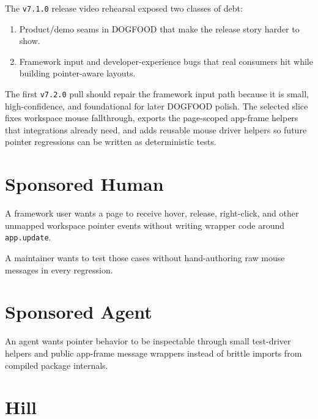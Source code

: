 The \texttt{v\allowbreak{}7\allowbreak{}.\allowbreak{}1\allowbreak{}.\allowbreak{}0} release video rehearsal exposed two classes of debt:

\begin{enumerate}
\def\labelenumi{\arabic{enumi}.}
\tightlist
\item
  Product/demo seams in DOGFOOD that make the release story harder to show.
\item
  Framework input and developer-experience bugs that real consumers hit while building pointer-aware layouts.
\end{enumerate}

The first \texttt{v\allowbreak{}7\allowbreak{}.\allowbreak{}2\allowbreak{}.\allowbreak{}0} pull should repair the framework input path because it is small, high-confidence, and foundational for later DOGFOOD polish. The selected slice fixes workspace mouse fallthrough, exports the page-scoped app-frame helpers that integrations already need, and adds reusable mouse driver helpers so future pointer regressions can be written as deterministic tests.

\section{Sponsored Human}\label{record-165-sponsored-human}

A framework user wants a page to receive hover, release, right-click, and other unmapped workspace pointer events without writing wrapper code around \texttt{a\allowbreak{}p\allowbreak{}p\allowbreak{}.\allowbreak{}u\allowbreak{}p\allowbreak{}d\allowbreak{}a\allowbreak{}t\allowbreak{}e}.

A maintainer wants to test those cases without hand-authoring raw mouse messages in every regression.

\section{Sponsored Agent}\label{record-165-sponsored-agent}

An agent wants pointer behavior to be inspectable through small test-driver helpers and public app-frame message wrappers instead of brittle imports from compiled package internals.

\section{Hill}\label{record-165-hill}

